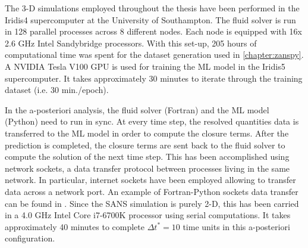 \documentclass[../main.tex]{subfiles}
\begin{document}
The 3-D simulations employed throughout the thesis have been performed in the Iridis4 supercomputer at the University of Southampton.
The fluid solver is run in 128 parallel processes across 8 different nodes.
Each node is equipped with 16x 2.6 GHz Intel\textsuperscript\textregistered $ $ Sandybridge\texttrademark $ $ processors. With this set-up, 205 hours of computational time was spent for the dataset generation used in \cref{chapter:zanspy}.
A NVIDIA\textsuperscript\textregistered $ $ Tesla V100 GPU is used for training the ML model in the Iridis5 supercomputer.
It takes approximately 30 minutes to iterate through the training dataset (i.e. 30 min./epoch).

In the a-posteriori analysis, the fluid solver (Fortran) and the ML model (Python) need to run in sync.
At every time step, the resolved quantities data is transferred to the ML model in order to compute the closure terms.
After the prediction is completed, the closure terms are sent back to the fluid solver to compute the solution of the next time step.
This has been accomplished using network sockets, a data transfer protocol between processes living in the same network.
In particular, internet sockets have been employed allowing to transfer data across a network port.
An example of Fortran-Python sockets data transfer can be found in \cite{Font2019-f2py}.
Since the SANS simulation is purely 2-D, this has been carried in a 4.0 GHz Intel\textsuperscript\textregistered $ $ Core\texttrademark $\,\,$i7-6700K processor using serial computations.
It takes approximately 40 minutes to complete $\Delta t^*=10$ time units in this a-posteriori configuration.
\end{document}
